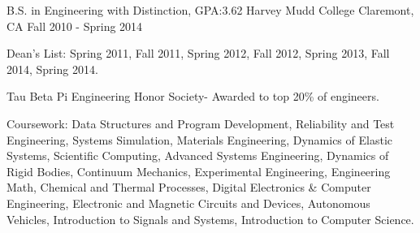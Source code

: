 

\begin{cventries}

  \cventry
    {B.S. in Engineering with Distinction, GPA:3.62} %
    {Harvey Mudd College} %
    {Claremont, CA} %
    {Fall 2010 - Spring 2014} %
    {
      \begin{cvitems} %
        \item {Dean’s List: Spring 2011, Fall 2011, Spring 2012, Fall 2012, Spring 2013, Fall 2014, Spring 2014.}
        \item {Tau Beta Pi Engineering Honor Society- Awarded to top 20\% of engineers.}
        \item {Coursework: Data Structures and Program Development, Reliability and Test Engineering, Systems Simulation, Materials Engineering, Dynamics of Elastic Systems, Scientific Computing, Advanced Systems Engineering, Dynamics of Rigid Bodies, Continuum Mechanics, Experimental Engineering, Engineering Math, Chemical and Thermal Processes, Digital Electronics \& Computer Engineering, Electronic and Magnetic Circuits and Devices, Autonomous Vehicles, Introduction to Signals and Systems, Introduction to Computer Science.}
      \end{cvitems}
    }

\end{cventries}